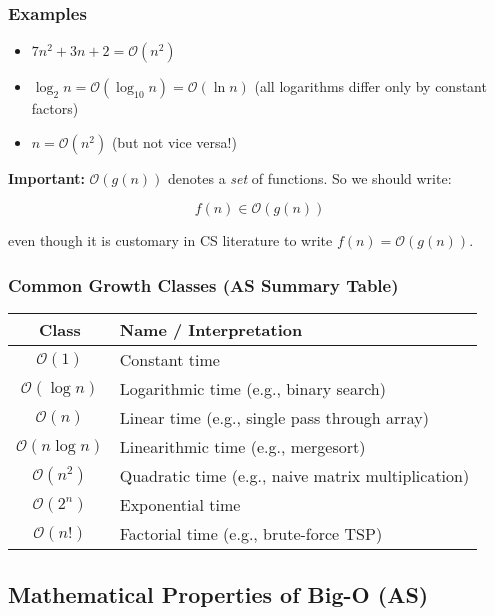 \documentclass{article}
\begin{document}
\subsubsection*{Examples}

\begin{itemize}
    \item $7n^2 + 3n + 2 = \mathcal{O}(n^2)$
    \item $\log_2 n = \mathcal{O}(\log_{10} n) = \mathcal{O}(\ln n)$ (all logarithms differ only by constant factors)
    \item $n = \mathcal{O}(n^2)$ (but not vice versa!)
\end{itemize}

\textbf{Important:} $\mathcal{O}(g(n))$ denotes a \textit{set} of functions. So we should write:

\[
f(n) \in \mathcal{O}(g(n))
\]

even though it is customary in CS literature to write $f(n) = \mathcal{O}(g(n))$.

\subsubsection*{Common Growth Classes (AS Summary Table)}

\begin{center}
\begin{tabular}{|c|l|}
\hline
\textbf{Class} & \textbf{Name / Interpretation} \\
\hline
$\mathcal{O}(1)$ & Constant time \\
$\mathcal{O}(\log n)$ & Logarithmic time (e.g., binary search) \\
$\mathcal{O}(n)$ & Linear time (e.g., single pass through array) \\
$\mathcal{O}(n \log n)$ & Linearithmic time (e.g., mergesort) \\
$\mathcal{O}(n^2)$ & Quadratic time (e.g., naive matrix multiplication) \\
$\mathcal{O}(2^n)$ & Exponential time \\
$\mathcal{O}(n!)$ & Factorial time (e.g., brute-force TSP) \\
\hline
\end{tabular}
\end{center}

\subsection*{Mathematical Properties of Big-O (AS)}
\end{document}
